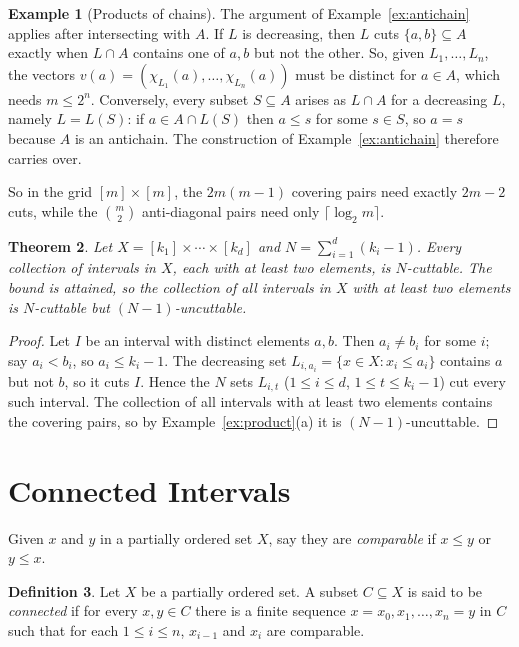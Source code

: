 \documentclass[10pt, a4paper]{article}
\theoremstyle{plain}
\newtheorem{theorem}{Theorem}[section]
\theoremstyle{definition}
\newtheorem{definition}[theorem]{Definition}
\newtheorem{example}[theorem]{Example}
\begin{document}
\begin{example}[Products of chains]
  The argument of Example~\ref{ex:antichain} applies after intersecting with $A$. If
  $L$ is decreasing, then $L$ cuts $\{a,b\}\subseteq A$ exactly when $L\cap A$
  contains one of $a,b$ but not the other. So, given $L_1,\ldots,L_n$, the vectors
  $v(a)=(\chi_{L_1}(a),\ldots,\chi_{L_n}(a))$ must be distinct for $a\in A$, which
  needs $m\le 2^n$. Conversely, every subset $S\subseteq A$ arises as $L\cap A$ for a
  decreasing $L$, namely $L=L(S)$: if $a\in A\cap L(S)$ then $a\le s$ for some
  $s\in S$, so $a=s$ because $A$ is an antichain. The construction of
  Example~\ref{ex:antichain} therefore carries over.

  So in the grid $[m]\times[m]$, the $2m(m-1)$ covering pairs need exactly $2m-2$
  cuts, while the $\binom{m}{2}$ anti-diagonal pairs need only $\lceil\log_2 m\rceil$.
\end{example}

\begin{theorem}\label{prop:product-bound}
  Let $X=[k_1]\times\cdots\times[k_d]$ and $N=\sum_{i=1}^d(k_i-1)$. Every collection of
  intervals in $X$, each with at least two elements, is $N$-cuttable. The bound is
  attained, so the collection of all intervals in $X$ with at least two elements is
  $N$-cuttable but $(N-1)$-uncuttable.
\end{theorem}

\begin{proof}
  Let $I$ be an interval with distinct elements $a,b$. Then $a_i\ne b_i$ for some $i$;
  say $a_i<b_i$, so $a_i\le k_i-1$. The decreasing set
  $L_{i,a_i}=\{x\in X : x_i\le a_i\}$ contains $a$ but not $b$, so it cuts $I$. Hence
  the $N$ sets $L_{i,t}$ ($1\le i\le d$, $1\le t\le k_i-1$) cut every such interval.
  The collection of all intervals with at least two elements contains the covering
  pairs, so by Example~\ref{ex:product}(a) it is $(N-1)$-uncuttable.
\end{proof}


\section{Connected Intervals}

Given $x$ and $y$ in a partially ordered set $X$, say they are \emph{comparable}
if $x\le y$ or $y\le x$.

\begin{definition}
  Let $X$ be a partially ordered set. A subset $C\subseteq X$ is said to be
  \emph{connected} if for every $x,y\in C$ there is a finite sequence
  $x=x_0,x_1,\ldots,x_n=y$ in $C$ such that for each $1 \le i \le n$,  $x_{i-1}$
  and $x_i$ are comparable.
\end{definition}
\end{document}
